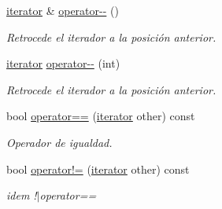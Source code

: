\begin{DoxyCompactItemize}
\hyperlink{classaed2_1_1map_1_1iterator}{iterator} \& \hyperlink{classaed2_1_1map_1_1iterator_ae7f70f71545d2a9de17b65edaaec748a_ae7f70f71545d2a9de17b65edaaec748a}{operator-\/-\/} ()
\begin{DoxyCompactList}\small\item\em Retrocede el iterador a la posición anterior. \end{DoxyCompactList}\item 
\hyperlink{classaed2_1_1map_1_1iterator}{iterator} \hyperlink{classaed2_1_1map_1_1iterator_add45e9ddbb8eeda99326cdb9ac9dd225_add45e9ddbb8eeda99326cdb9ac9dd225}{operator-\/-\/} (int)
\begin{DoxyCompactList}\small\item\em Retrocede el iterador a la posición anterior. \end{DoxyCompactList}\item 
bool \hyperlink{classaed2_1_1map_1_1iterator_ad052c1ef8477a1613c292202226053a5_ad052c1ef8477a1613c292202226053a5}{operator==} (\hyperlink{classaed2_1_1map_1_1iterator}{iterator} other) const 
\begin{DoxyCompactList}\small\item\em Operador de igualdad. \end{DoxyCompactList}\item 
bool \hyperlink{classaed2_1_1map_1_1iterator_a836c7a166d63f507c4f79085ae953c51_a836c7a166d63f507c4f79085ae953c51}{operator!=} (\hyperlink{classaed2_1_1map_1_1iterator}{iterator} other) const 
\begin{DoxyCompactList}\small\item\em idem !$\vert$operator== \end{DoxyCompactList}\end{DoxyCompactItemize}
